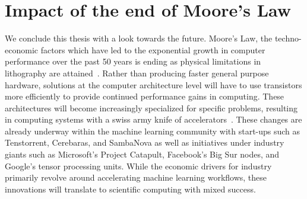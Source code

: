 \section{Impact of the end of Moore's Law}

We conclude this thesis with a look towards the future. Moore's Law, the techno-economic factors which have led to the exponential growth in computer performance over the past 50 years is ending as physical limitations in lithography are attained~\cite{Shalf2020}. Rather than producing faster general purpose hardware, solutions at the computer architecture level will have to use transistors more efficiently to provide continued performance gains in computing. These architectures will become increasingly specialized for specific problems, resulting in computing systems with a swiss army knife of accelerators~\cite{ExtremeHeterogeneity2018}. These changes are already underway within the machine learning community with start-ups such as Tenstorrent, Cerebaras, and SambaNova as well as initiatives under industry giants such as Microsoft's Project Catapult, Facebook's Big Sur nodes, and Google's tensor processing units. While the economic drivers for industry primarily revolve around accelerating machine learning workflows, these innovations will translate to scientific computing with mixed success.

